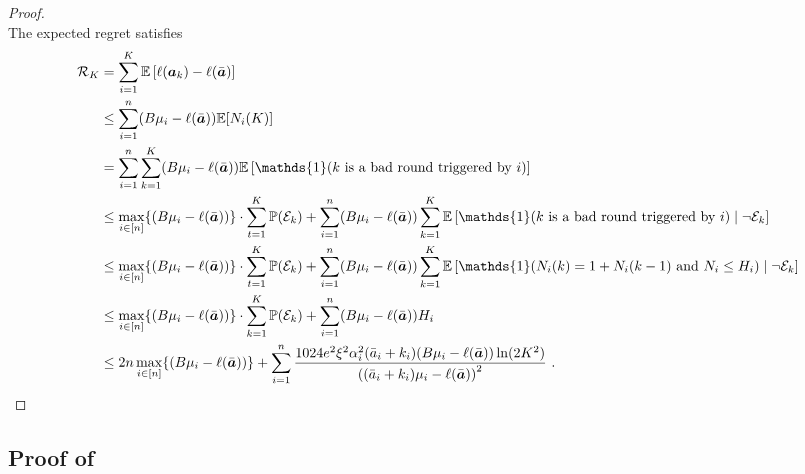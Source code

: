 \begin{proof}
$$	$$
	The expected regret satisfies
	\begin{align*}
		\mathcal{R}_K &= \sum_{i=1}^{K} \mathbb{E}\left[\ell(\bm{a}_k)-\ell(\bar{\bm{a}})\right]\\
		&\le \sum_{i=1}^{n} (B\mu_i-\ell(\bar{\bm{a}}))\mathbb{E}[N_i(K)]\\ 
		&= \sum_{i=1}^{n}\sum_{k=1}^{K} (B\mu_i-\ell(\bar{\bm{a}}))\mathbb{E}\left[\mathds{1}(k \text{ is a bad round triggered by }i)\right]\\
		&\le \max_{i\in [n]}\{(B\mu_i-\ell(\bar{\bm{a}}))\}\cdot\sum_{t=1}^{K} \mathbb{P}(\mathcal{E}_k)+ \sum_{i=1}^{n}(B\mu_i-\ell(\bar{\bm{a}}))\sum_{k=1}^{K} \mathbb{E}\left[\mathds{1}(k \text{ is a bad round triggered by }i) \mid \neg \mathcal{E}_k\right]\\
		&\le \max_{i\in [n]}\{(B\mu_i-\ell(\bar{\bm{a}}))\}\cdot\sum_{t=1}^{K} \mathbb{P}(\mathcal{E}_k)+ \sum_{i=1}^{n}(B\mu_i-\ell(\bar{\bm{a}}))\sum_{k=1}^{K} \mathbb{E}\left[\mathds{1}(N_i(k)=1+N_i(k-1) \text{ and } N_i \le H_i ) \mid \neg \mathcal{E}_k\right]\\
		&\le \max_{i\in [n]}\{(B\mu_i-\ell(\bar{\bm{a}}))\}\cdot\sum_{k=1}^{K} \mathbb{P}(\mathcal{E}_k)+ \sum_{i=1}^{n} (B\mu_i-\ell(\bar{\bm{a}}))H_i\\
		&\le 2n \max_{i\in [n]}\{(B\mu_i-\ell(\bar{\bm{a}}))\}+  \sum_{i=1}^{n} \frac{1024e^2 \xi^2\alpha_i^2 (\bar{a}_i+k_i)(B \mu_i - \ell(\bar{\ba})) \ln(2K^2)}{\left((\bar{a}_i+k_i)\mu_i - \ell(\bar{\bm{a}})\right)^2}~. \qedhere
	\end{align*}
\end{proof}













\subsection{Proof of }
\label{sec:proof_2}

